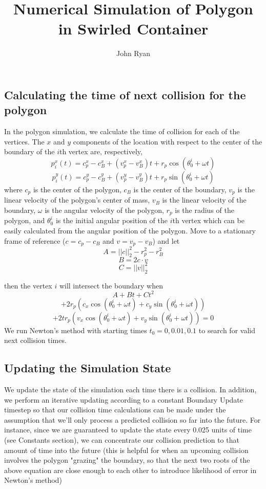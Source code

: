 \documentclass{article}
\title{Numerical Simulation of Polygon in Swirled Container}
\author{John Ryan}
\begin{document}
\maketitle

\subsection*{Calculating the time of next collision for the polygon}
In the polygon simulation, we calculate the time of collision for each of the vertices. The $x$ and $y$ components of the location with respect to the center of the boundary of the $i$th vertex are, respectively,
\[p_i^x(t)=c_p^x - c_B^x + (v_p^x-v_B^x)t +r_p\cos(\theta_0^i+\omega t)\]
\[p_i^y(t)=c_p^y - c_B^y +  (v_p^y-v_B^y)t +r_p\sin(\theta_0^i+\omega t)\]
where $c_p$ is the center of the polygon, $c_B$ is the center of the boundary, $v_p$ is the linear velocity of the polygon's center of mass, $v_B$ is the linear velocity of the boundary, $\omega$ is the angular velocity of the polygon, $r_p$ is the radius of the polygon, and $\theta_0^i$ is the initial angular position of the $i$th vertex which can be easily calculated from the angular position of the polygon. 
Move to a stationary frame of reference ($c=c_p-c_B$ and $v=v_p-v_B$) and let 
\[A = ||c||_2^2 - r_p^2 - r_B^2\]
\[B = 2c\cdot v\]
\[C = ||v||_2^2\]

then the vertex $i$ will intersect the boundary when 
\[A + Bt + Ct^2 \]
\[+2r_p\left(c_x\cos(\theta_0^i+\omega t) + c_y\sin(\theta_0^i+\omega t)\right)\]
\[+2tr_p\left(v_x\cos(\theta_0^i+\omega t) + v_y\sin(\theta_0^i+\omega t)\right) = 0\]
We run Newton's method with starting times $t_0=0,0.01,0.1$ to search for valid next collision times. 
\subsection*{Updating the Simulation State}
We update the state of the simulation each time there is a collision. In addition, we perform an iterative updating according to a constant Boundary Update timestep so that our collision time calculations can be made under the assumption that we'll only process a predicted collision so far into the future. For instance, since we are guaranteed to update the state every 0.025 units of time (see Constants section), we can concentrate our collision prediction to that amount of time into the future (this is helpful for when an upcoming collision involves the polygon "grazing" the boundary, so that the next two roots of the above equation are close enough to each other to introduce likelihood of error in Newton's method) 
\end{document}
